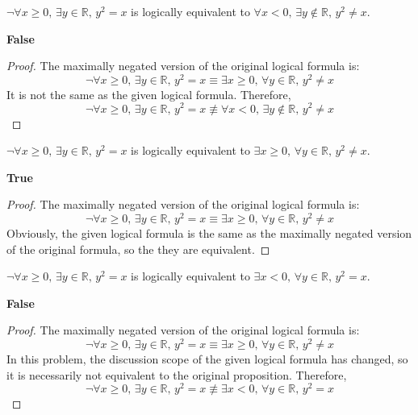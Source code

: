 \begin{chapex} %
$\neg \forall x \ge 0,\, \exists y \in \mathbb{R},\, y^2=x$ is logically equivalent to $\forall x < 0,\, \exists y \not\in \mathbb{R},\, y^2 \ne x$.
\end{chapex}

\begin{mysolution}
    \textbf{False}

    \begin{proof}
        The maximally negated version of the original logical formula is:
        $$
        \neg \forall x \ge 0,\, \exists y \in \mathbb{R},\, y^2=x \equiv \exists x \ge 0,\, \forall y \in \mathbb{R},\, y^2 \ne x
        $$
        It is not the same as the given logical formula. Therefore, 
        $$
        \neg \forall x \ge 0,\, \exists y \in \mathbb{R},\, y^2=x \not\equiv \forall x < 0,\, \exists y \not\in \mathbb{R},\, y^2 \ne x
        $$
    \end{proof}
\end{mysolution}

\begin{chapex} %
$\neg \forall x \ge 0,\, \exists y \in \mathbb{R},\, y^2=x$ is logically equivalent to $\exists x \ge 0,\, \forall y \in \mathbb{R},\, y^2 \ne x$.
\end{chapex}

\begin{mysolution}
    \textbf{True}

    \begin{proof}
        The maximally negated version of the original logical formula is:
        \[
        \neg \forall x \ge 0,\, \exists y \in \mathbb{R},\, y^2=x \equiv \exists x \ge 0,\, \forall y \in \mathbb{R},\, y^2 \ne x
        \]
        Obviously, the given logical formula is the same as the maximally negated version of the original formula, so the they are equivalent.
    \end{proof}
\end{mysolution}

\begin{chapex} %
\label{cqLogicTFEnd}
$\neg \forall x \ge 0,\, \exists y \in \mathbb{R},\, y^2=x$ is logically equivalent to $\exists x < 0,\, \forall y \in \mathbb{R},\, y^2 = x$.
\end{chapex}

\begin{mysolution}
    \textbf{False}

    \begin{proof}
        The maximally negated version of the original logical formula is:
        $$
        \neg \forall x \ge 0,\, \exists y \in \mathbb{R},\, y^2=x \equiv \exists x \ge 0,\, \forall y \in \mathbb{R},\, y^2 \ne x
        $$
        In this problem, the discussion scope of the given logical formula has changed, so it is necessarily not equivalent to the original proposition. Therefore,
        $$
        \neg \forall x \ge 0,\, \exists y \in \mathbb{R},\, y^2=x \not\equiv \exists x < 0,\, \forall y \in \mathbb{R},\, y^2 = x
        $$
    \end{proof}
\end{mysolution}

